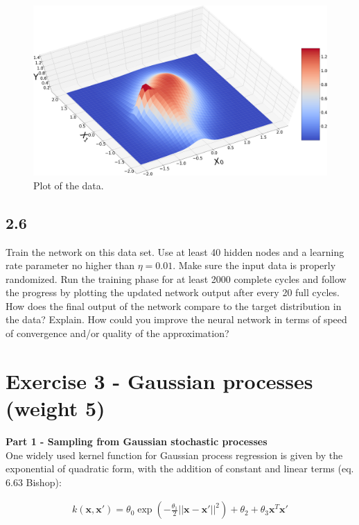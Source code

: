 \documentclass[a4paper]{article}
\begin{document}
\begin{figure}[H]
\includegraphics[width=\textwidth]{Images/2,5.png}
\caption{Plot of the data.}
\label{2.5}
\end{figure}






\subsection*{2.6}

Train the network on this data set. Use at least 40 hidden nodes and a learning rate parameter no higher than $\eta = 0.01$. Make sure the input data is properly randomized. Run the training phase for at least 2000 complete cycles and follow the progress by plotting the updated network output after every 20 full cycles. How does the final output of the network compare to the target distribution in the data? Explain. How could you improve the neural network in terms of speed of convergence and/or quality of the approximation?



\section*{Exercise 3 - Gaussian processes (weight 5)}


\textbf{Part 1 - Sampling from Gaussian stochastic processes}\\

One widely used kernel function for Gaussian process regression is given by the exponential of quadratic form, with the addition of constant and linear terms (eq. 6.63 Bishop):

\begin{eqnarray} \label{eq:5}
k(\textbf{x}, \textbf{x}') = \theta_0 \exp(- \frac{\theta_1}{2} || \textbf{x} - \textbf{x}' ||^2) + \theta_2 + \theta_3 \textbf{x}^T \textbf{x}'
\end{eqnarray}
\end{document}
